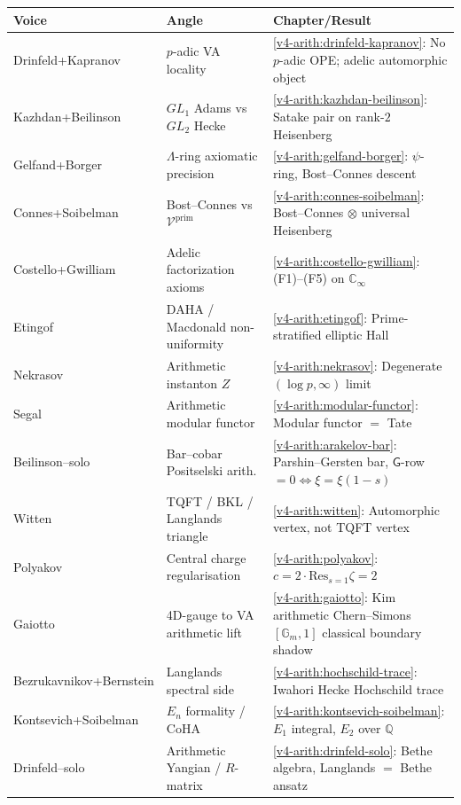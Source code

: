 \begin{longtable}{p{2.2cm}p{4.0cm}p{5.3cm}}
\toprule
Voice & Angle & Chapter/Result \\
\midrule
Drinfeld+Kapranov & \(p\)-adic VA locality & \ref{v4-arith:drinfeld-kapranov}: No \(p\)-adic OPE; adelic automorphic object \\
Kazhdan+Beilinson & \(GL_{1}\) Adams vs \(GL_{2}\) Hecke & \ref{v4-arith:kazhdan-beilinson}: Satake pair on rank-\(2\) Heisenberg \\
Gelfand+Borger & \(\Lambda\)-ring axiomatic precision & \ref{v4-arith:gelfand-borger}: \(\psi\)-ring, Bost--Connes descent \\
Connes+Soibelman & Bost--Connes vs \(\mathcal{V}^{\mathrm{prim}}\) & \ref{v4-arith:connes-soibelman}: Bost--Connes \(\otimes\) universal Heisenberg \\
Costello+Gwilliam & Adelic factorization axioms & \ref{v4-arith:costello-gwilliam}: (F1)--(F5) on \(\mathbb{C}_{\infty}\) \\
Etingof & DAHA / Macdonald non-uniformity & \ref{v4-arith:etingof}: Prime-stratified elliptic Hall \\
Nekrasov & Arithmetic instanton \(Z\) & \ref{v4-arith:nekrasov}: Degenerate \((\log p,\infty)\) limit \\
Segal & Arithmetic modular functor & \ref{v4-arith:modular-functor}: Modular functor \(=\) Tate \\
Beilinson--solo & Bar--cobar Positselski arith. & \ref{v4-arith:arakelov-bar}: Parshin--Gersten bar, \(\mathsf{G}\)-row \(=0\Leftrightarrow\xi=\xi(1-s)\) \\
Witten & TQFT / BKL / Langlands triangle & \ref{v4-arith:witten}: Automorphic vertex, not TQFT vertex \\
Polyakov & Central charge regularisation & \ref{v4-arith:polyakov}: \(c=2\cdot\mathrm{Res}_{s=1}\zeta=2\) \\
Gaiotto & 4D-gauge to VA arithmetic lift & \ref{v4-arith:gaiotto}: Kim arithmetic Chern--Simons \([\mathbb{G}_{m},1]\) classical boundary shadow \\
Bezrukavnikov+Bernstein & Langlands spectral side & \ref{v4-arith:hochschild-trace}: Iwahori Hecke Hochschild trace \\
Kontsevich+Soibelman & \(E_{n}\) formality / CoHA & \ref{v4-arith:kontsevich-soibelman}: \(E_{1}\) integral, \(E_{2}\) over \(\mathbb{Q}\) \\
Drinfeld--solo & Arithmetic Yangian / \(R\)-matrix & \ref{v4-arith:drinfeld-solo}: Bethe algebra, Langlands \(=\) Bethe ansatz \\
\bottomrule
\end{longtable}

